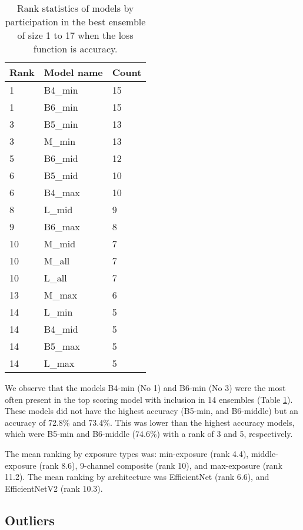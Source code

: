 \documentclass[10pt,letterpaper]{article}
\begin{document}
\begin{center}
\begin{table}[hbt!]
\caption{Rank statistics of models by participation in the best ensemble of size 1 to 17 when the loss function is accuracy.}
\begin{tabular}{ |l|l|l| }
\hline
Rank & Model name & Count   \\ \hline
1 &  B4\_min & 15 \\ \hline
1 &  B6\_min & 15 \\ \hline
3 &  B5\_min & 13 \\ \hline
3 &  M\_min  & 13 \\ \hline
5 &  B6\_mid & 12 \\ \hline
6 &  B5\_mid & 10 \\ \hline
6 &  B4\_max & 10 \\ \hline
8 &  L\_mid  & 9 \\ \hline
9 &  B6\_max & 8 \\ \hline
10 & M\_mid  & 7 \\ \hline
10 & M\_all  & 7 \\ \hline
10 & L\_all  & 7 \\ \hline
13 & M\_max  & 6 \\ \hline
14 & L\_min  & 5 \\ \hline
14 & B4\_mid & 5 \\ \hline
14 & B5\_max & 5 \\ \hline
14 & L\_max  & 5 \\ \hline
\end{tabular}
\label{table8}
\end{table}
\end{center}

We observe that the models B4-min (No 1) and B6-min (No 3) were the most often present in the top scoring model with inclusion in 14 ensembles (Table \ref{table8}). These models did not have the highest accuracy (B5-min, and B6-middle) but an accuracy of 72.8\% and 73.4\%. This was lower than the highest accuracy models, which were B5-min and B6-middle (74.6\%) with a rank of 3 and 5, respectively.

The mean ranking by exposure types was: min-exposure (rank 4.4), middle-exposure (rank 8.6), 9-channel composite (rank 10), and max-exposure (rank 11.2). The mean ranking by architecture was EfficientNet (rank 6.6), and EfficientNetV2 (rank 10.3).

\subsection{Outliers}
\end{document}
